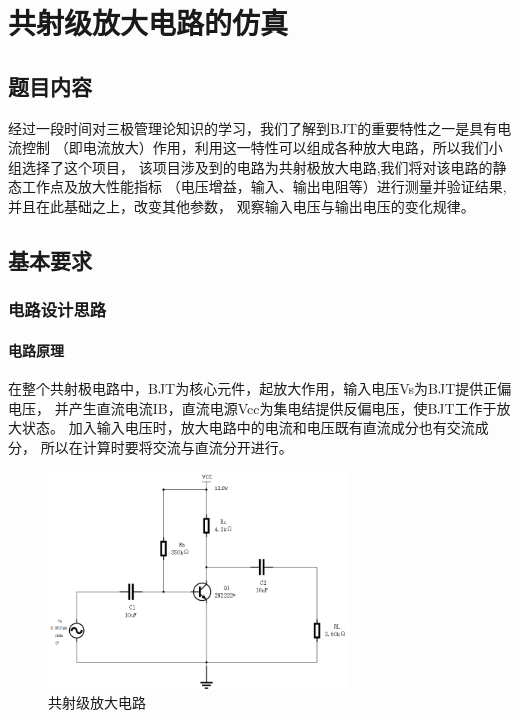 \documentclass[10pt, conference, compsocconf, a4paper]{IEEEtran}
\begin{document}
\IEEEpeerreviewmaketitle

\section{共射级放大电路的仿真}
\subsection{题目内容}
经过一段时间对三极管理论知识的学习，我们了解到BJT的重要特性之一是具有电流控制
（即电流放大）作用，利用这一特性可以组成各种放大电路，所以我们小组选择了这个项目，
该项目涉及到的电路为共射极放大电路,我们将对该电路的静态工作点及放大性能指标
（电压增益，输入、输出电阻等）进行测量并验证结果,并且在此基础之上，改变其他参数，
观察输入电压与输出电压的变化规律。

\subsection{基本要求}
\subsubsection{电路设计思路}
\paragraph{电路原理}\noindent

在整个共射极电路中，BJT为核心元件，起放大作用，输入电压Vs为BJT提供正偏电压，
并产生直流电流IB，直流电源Vcc为集电结提供反偏电压，使BJT工作于放大状态。
加入输入电压时，放大电路中的电流和电压既有直流成分也有交流成分，
所以在计算时要将交流与直流分开进行。

\begin{figure}[h]
  \includegraphics[width=8cm]{img/path1.png}
  \caption{共射级放大电路}
\end{figure}
\end{document}
